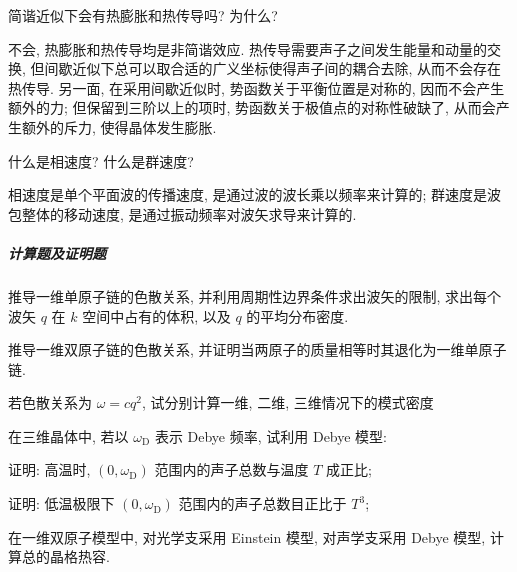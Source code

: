 \documentclass[UTF8]{ctexart}
\newenvironment{Answer}{}{}
\begin{document}
\begin{Question}
            \item 简谐近似下会有热膨胀和热传导吗? 为什么?

\begin{Answer}
    \begin{Solve}[Solve:]
        \hspace*{2em}不会, 热膨胀和热传导均是非简谐效应. 热传导需要声子之间发生能量和动量的交换, 但间歇近似下总可以取合适的广义坐标使得声子间的耦合去除, 从而不会存在热传导. 另一面, 在采用间歇近似时, 势函数关于平衡位置是对称的, 因而不会产生额外的力; 但保留到三阶以上的项时, 势函数关于极值点的对称性破缺了, 从而会产生额外的斥力, 使得晶体发生膨胀.
    \end{Solve}
\end{Answer}

            \item 什么是相速度? 什么是群速度?

\begin{Answer}
    \begin{Solve}[Solve:]
        \hspace*{2em}相速度是单个平面波的传播速度, 是通过波的波长乘以频率来计算的; 群速度是波包整体的移动速度, 是通过振动频率对波矢求导来计算的.
    \end{Solve}
\end{Answer}
        \end{Question}

    \subparagraph{计算题及证明题}
        \begin{Question}
            \item 推导一维单原子链的色散关系, 并利用周期性边界条件求出波矢的限制, 求出每个波矢 $q$ 在 $k$ 空间中占有的体积, 以及 $q$ 的平均分布密度.
            \item 推导一维双原子链的色散关系, 并证明当两原子的质量相等时其退化为一维单原子链.
            \item 若色散关系为 $\omega = c q^2$, 试分别计算一维, 二维, 三维情况下的模式密度
            \item 在三维晶体中, 若以 $\omega_\mathrm{D}$ 表示 Debye 频率, 试利用 Debye 模型:
                \begin{Question}
                    \item 证明: 高温时, $(0, \omega_\mathrm{D})$ 范围内的声子总数与温度 $T$ 成正比;
                    \item 证明: 低温极限下 $(0, \omega_\mathrm{D})$ 范围内的声子总数目正比于 $T^{3}$;
                \end{Question}
            \item 在一维双原子模型中, 对光学支采用 Einstein 模型, 对声学支采用 Debye 模型, 计算总的晶格热容.
        \end{Question}
\end{document}
